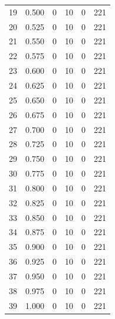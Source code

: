 \documentclass[a4paper,twoside,12pt]{book}
\begin{document}
\begin{appendices}
\begin{table}
\begin{tabular}{lrrrrr}
		19 &  0.500 &         0 &        10 &               0 &             221 \\
		20 &  0.525 &         0 &        10 &               0 &             221 \\
		21 &  0.550 &         0 &        10 &               0 &             221 \\
		22 &  0.575 &         0 &        10 &               0 &             221 \\
		23 &  0.600 &         0 &        10 &               0 &             221 \\
		24 &  0.625 &         0 &        10 &               0 &             221 \\
		25 &  0.650 &         0 &        10 &               0 &             221 \\
		26 &  0.675 &         0 &        10 &               0 &             221 \\
		27 &  0.700 &         0 &        10 &               0 &             221 \\
		28 &  0.725 &         0 &        10 &               0 &             221 \\
		29 &  0.750 &         0 &        10 &               0 &             221 \\
		30 &  0.775 &         0 &        10 &               0 &             221 \\
		31 &  0.800 &         0 &        10 &               0 &             221 \\
		32 &  0.825 &         0 &        10 &               0 &             221 \\
		33 &  0.850 &         0 &        10 &               0 &             221 \\
		34 &  0.875 &         0 &        10 &               0 &             221 \\
		35 &  0.900 &         0 &        10 &               0 &             221 \\
		36 &  0.925 &         0 &        10 &               0 &             221 \\
		37 &  0.950 &         0 &        10 &               0 &             221 \\
		38 &  0.975 &         0 &        10 &               0 &             221 \\
		39 &  1.000 &         0 &        10 &               0 &             221 \\
		\bottomrule
	\end{tabular}
\end{table}



\end{appendices}
\end{document}
